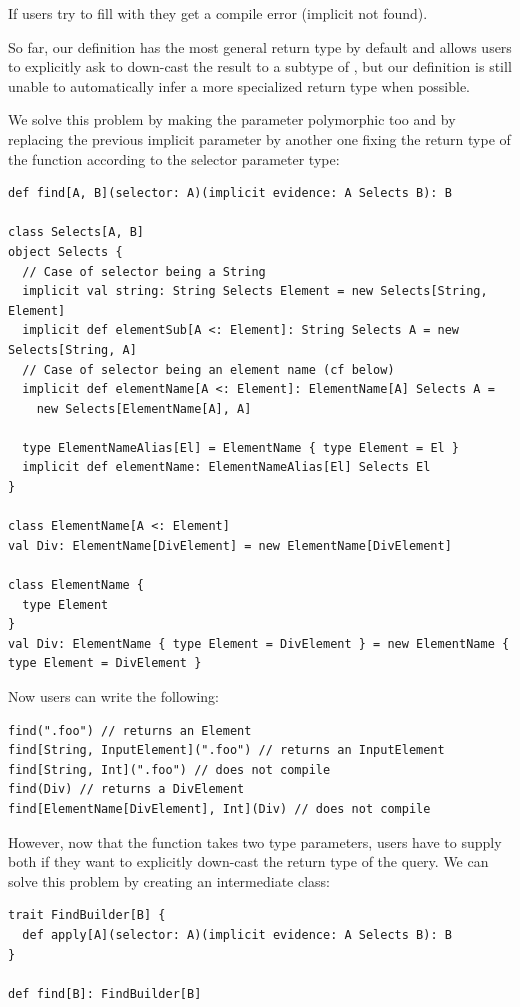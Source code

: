 \documentclass[runningheads,a4paper]{llncs}
\begin{document}
If users try to fill  with  they get a compile error (implicit not found).

So far, our definition has the most general return type by default and allows users to explicitly
ask to down-cast the result to a subtype of , but our definition is still unable to
automatically infer a more specialized return type when possible.

We solve this problem by making the  parameter polymorphic too and by replacing the
previous implicit parameter by another one fixing the return type of the function according to the
selector parameter type:

\begin{lstlisting}
def find[A, B](selector: A)(implicit evidence: A Selects B): B

class Selects[A, B]
object Selects {
  // Case of selector being a String
  implicit val string: String Selects Element = new Selects[String, Element]
  implicit def elementSub[A <: Element]: String Selects A = new Selects[String, A]
  // Case of selector being an element name (cf below)
  implicit def elementName[A <: Element]: ElementName[A] Selects A =
    new Selects[ElementName[A], A]

  type ElementNameAlias[El] = ElementName { type Element = El }
  implicit def elementName: ElementNameAlias[El] Selects El
}

class ElementName[A <: Element]
val Div: ElementName[DivElement] = new ElementName[DivElement]

class ElementName {
  type Element
}
val Div: ElementName { type Element = DivElement } = new ElementName { type Element = DivElement }
\end{lstlisting}

Now users can write the following:

\begin{lstlisting}
find(".foo") // returns an Element
find[String, InputElement](".foo") // returns an InputElement
find[String, Int](".foo") // does not compile
find(Div) // returns a DivElement
find[ElementName[DivElement], Int](Div) // does not compile
\end{lstlisting}

However, now that the  function takes two type parameters, users have to supply both
if they want to explicitly down-cast the return type of the query. We can solve this problem by
creating an intermediate class:

\begin{lstlisting}
trait FindBuilder[B] {
  def apply[A](selector: A)(implicit evidence: A Selects B): B
}

def find[B]: FindBuilder[B]
\end{lstlisting}
\end{document}
